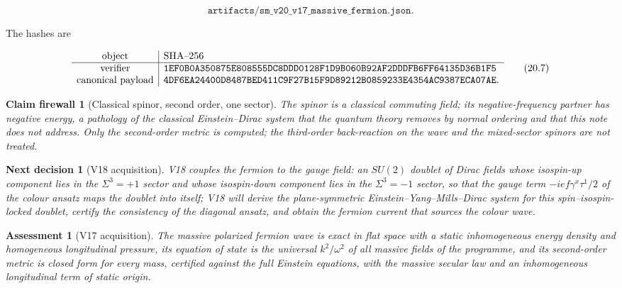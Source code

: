 \documentclass[11pt]{article}
\newtheorem{firewall}[theorem]{Claim firewall}
\newtheorem{decision}[theorem]{Next decision}
\newtheorem{assessment}[theorem]{Assessment}
\theoremstyle{remark}
\begin{document}
\[
 \texttt{artifacts/sm\_v20\_v17\_massive\_fermion.json}.              \tag{20.6}
\]

The hashes are

\[
\begin{array}{c|l}
\hbox{object}&\hbox{SHA--256}\\ \hline
\hbox{verifier}&
\texttt{1EF0B0A350875E808555DC8DDD0128F1D9B060B92AF2DDDFB6FF64135D36B1F5}\\
\hbox{canonical payload}&
\texttt{4DF6EA24400D8487BED411C9F27B15F9D89212B0859233E4354AC9387ECA07AE}.
\end{array}                                                     \tag{20.7}
\]

\begin{firewall}[Classical spinor, second order, one sector]
\label{fire:v20v17}
The spinor is a classical commuting field; its negative-frequency
partner has negative energy, a pathology of the classical
Einstein--Dirac system that the quantum theory removes by normal
ordering and that this note does not address.  Only the second-order
metric is computed; the third-order back-reaction on the wave and the
mixed-sector spinors are not treated.
\end{firewall}

\begin{decision}[V18 acquisition]
\label{dec:v20v17-next}
V18 couples the fermion to the gauge field: an \(SU(2)\) doublet of
Dirac fields whose isospin-up component lies in the \(\Sigma^3=+1\)
sector and whose isospin-down component lies in the \(\Sigma^3=-1\)
sector, so that the gauge term \(-ie f\gamma^x\tau^1/2\) of the colour
ansatz maps the doublet into itself; V18 will derive the plane-symmetric
Einstein--Yang--Mills--Dirac system for this spin--isospin-locked
doublet, certify the consistency of the diagonal ansatz, and obtain
the fermion current that sources the colour wave.
\end{decision}

\begin{assessment}[V17 acquisition]
\label{ass:v20v17}
The massive polarized fermion wave is exact in flat space with a
static inhomogeneous energy density and homogeneous longitudinal
pressure, its equation of state is the universal \(k^2/\omega^2\) of
all massive fields of the programme, and its second-order metric is
closed form for every mass, certified against the full Einstein
equations, with the massive secular law and an inhomogeneous
longitudinal term of static origin.
\end{assessment}
\end{document}
